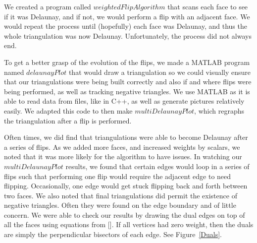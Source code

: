 \documentclass[12pt]{article}
\begin{document}
\noindent We created a program called $weightedFlipAlgorithm$ that scans each face to see if it was Delaunay, and if not, we would perform a flip with an adjacent face. We would repeat the process until (hopefully) each face was Delaunay, and thus the whole triangulation was now Delaunay. Unfortunately, the process did not always end. \newline

\noindent To get a better grasp of the evolution of the flips, we made a MATLAB program named $delaunayPlot$ that would draw a triangulation so we could visually ensure that our triangulations were being built correctly and also if and where flips were being performed, as well as tracking negative triangles. We use MATLAB as it is able to read data from files, like in C++, as well as generate pictures relatively easily. We adapted this code to then make $multiDelaunayPlot$, which regraphs the triangulation after a flip is performed. \newline

\noindent Often times, we did find that triangulations were able to become Delaunay after a series of flips. As we added more faces, and increased weights by scalars, we noted that it was more likely for the algorithm to have issues. In watching our $multiDelaunayPlot$ results, we found that certain edges would loop in a series of flips such that performing one flip would require the adjacent edge to need flipping. Occasionally, one edge would get stuck flipping back and forth between two faces. We also noted that final triangulations did permit the existence of negative triangles. Often they were found on the edge boundary and of little concern. We were able to check our results by drawing the dual edges on top of all the faces using equations from []. If all vertices had zero weight, then the duals are simply the perpendicular bisectors of each edge. See Figure~\ref{Duals}. \newline
\end{document}
